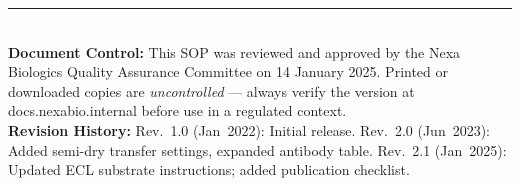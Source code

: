 \vfill

\par\vspace{10pt}
{\small\color{GrayMid}
\noindent\rule{\textwidth}{0.4pt}\\[4pt]
\textbf{Document Control:} This SOP was reviewed and approved by the Nexa Biologics
Quality Assurance Committee on 14 January 2025. Printed or downloaded copies are
\textit{uncontrolled} — always verify the version at docs.nexabio.internal before
use in a regulated context.\\[2pt]
\textbf{Revision History:}
Rev.~1.0 (Jan~2022): Initial release. \quad
Rev.~2.0 (Jun~2023): Added semi-dry transfer settings, expanded antibody table. \quad
Rev.~2.1 (Jan~2025): Updated ECL substrate instructions; added publication checklist.
}

